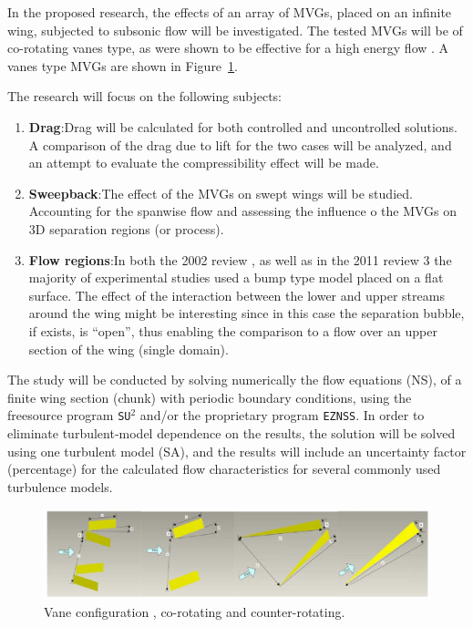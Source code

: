 \documentclass[10pt,a4paper]{article}
\begin{document}
In the proposed research, the effects of an array of MVGs, placed on an infinite wing, subjected to subsonic flow will be investigated. The tested MVGs will be of co-rotating vanes type, as were shown to be effective for a high energy flow \cite{1,2}. A vanes type MVGs are shown in Figure~\ref{fig:vanes}.\par
The research will focus on the following subjects:
\begin{enumerate}
	\item \textbf{Drag}:\quad Drag will be calculated for both controlled and uncontrolled solutions. A comparison of the drag due to lift for the two cases will be analyzed, and an attempt to evaluate the compressibility effect will be made.
	\item \textbf{Sweepback}:\quad The effect of the MVGs on swept wings will be studied. Accounting for the spanwise flow and assessing the influence o the MVGs on 3D separation regions (or process). 
	\item \textbf{Flow regions}:\quad In both the 2002 review \cite{1}, as well as in the 2011 review {3} the majority of experimental studies used a bump type model placed on a flat surface. The effect of the interaction between the lower and upper streams around the wing might be interesting since in this case the separation bubble, if exists, is ``open'', thus enabling the comparison to a flow over an upper section of the wing (single domain).
\end{enumerate} 
\par
The study will be conducted by solving numerically the flow equations (NS), of a finite wing section (chunk) with periodic boundary conditions, using the freesource program \texttt{SU$^2$} and/or the proprietary program \texttt{EZNSS}. In order to eliminate turbulent-model dependence on the results, the solution will be solved using one turbulent model (SA), and the results will include an uncertainty factor (percentage) for the calculated flow characteristics for several commonly used turbulence models.
\begin{figure}[ht!]
	\includegraphics[width=1\textwidth]{vanes.png}
	\caption{Vane configuration \cite{3}, co-rotating and counter-rotating.}
	\label{fig:vanes}
\end{figure}
\end{document}
